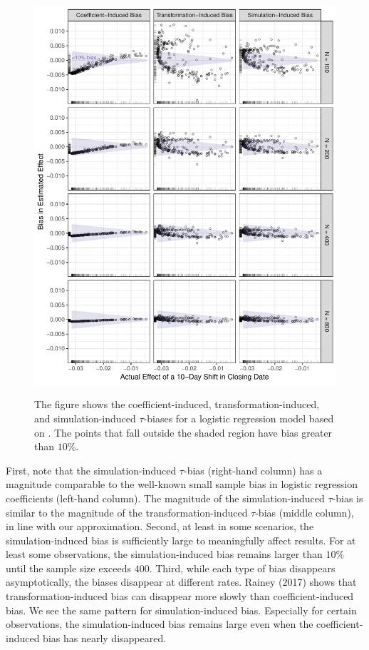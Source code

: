 \documentclass[11pt]{article}
\begin{document}
\begin{figure}[h!]
\begin{center}
\includegraphics[scale = 0.75]{figs/nagler-fd-bias.pdf}\\
\vspace{.1in}
\caption{The figure shows the coefficient-induced, transformation-induced, and simulation-induced $\tau$-biases for a logistic regression model based on \cite{BerryDeMerittEsarey2010}.
The points that fall outside the shaded region have bias greater than $10\%$.}\label{fig:nagler}
\end{center}
\end{figure}

First, note that the simulation-induced $\tau$-bias (right-hand column) has a magnitude comparable to the well-known small sample bias in logistic regression coefficients (left-hand column). The magnitude of the simulation-induced $\tau$-bias is similar to the magnitude of the transformation-induced $\tau$-bias (middle column), in line with our approximation. Second, at least in some scenarios, the simulation-induced bias is sufficiently large to meaningfully affect results. For at least some observations, the simulation-induced bias remains larger than $10\%$ until the sample size exceeds $400$. Third, while each type of bias disappears asymptotically, the biases disappear at different rates. Rainey (2017) shows that transformation-induced bias can disappear more slowly than coefficient-induced bias. We see the same pattern for simulation-induced bias. Especially for certain observations, the simulation-induced bias remains large even when the coefficient-induced bias has nearly disappeared. 
\end{document}
